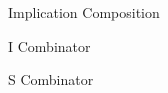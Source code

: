 \documentclass{book}
\begin{document}
    \begin{eg}{Implication Composition}




	


    \end{eg}

    \begin{eg}{I Combinator}
        
    \end{eg}

    \begin{eg}{S Combinator}
        
    \end{eg}
\end{document}
